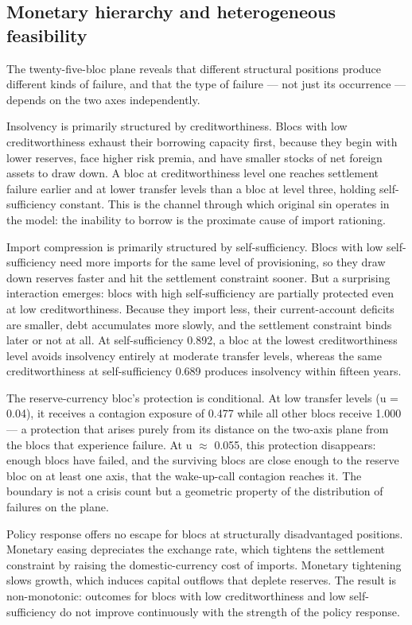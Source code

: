 \documentclass[preprint,review,12pt]{elsarticle}
\begin{document}
\subsection{Monetary hierarchy and heterogeneous feasibility}

The twenty-five-bloc plane reveals that different structural positions
produce different kinds of failure, and that the type of failure --- not
just its occurrence --- depends on the two axes independently.

Insolvency is primarily structured by creditworthiness. Blocs with low
creditworthiness exhaust their borrowing capacity first, because they
begin with lower reserves, face higher risk premia, and have smaller
stocks of net foreign assets to draw down. A bloc at creditworthiness
level one reaches settlement failure earlier and at lower transfer
levels than a bloc at level three, holding self-sufficiency constant.
This is the channel through which original sin operates in the model:
the inability to borrow is the proximate cause of import rationing.

Import compression is primarily structured by self-sufficiency. Blocs
with low self-sufficiency need more imports for the same level of
provisioning, so they draw down reserves faster and hit the settlement
constraint sooner. But a surprising interaction emerges: blocs with high
self-sufficiency are partially protected even at low creditworthiness.
Because they import less, their current-account deficits are smaller,
debt accumulates more slowly, and the settlement constraint binds later
or not at all. At self-sufficiency 0.892, a bloc at the lowest
creditworthiness level avoids insolvency entirely at moderate transfer
levels, whereas the same creditworthiness at self-sufficiency 0.689
produces insolvency within fifteen years.

The reserve-currency bloc's protection is conditional. At low transfer
levels (u = 0.04), it receives a contagion exposure of 0.477 while all
other blocs receive 1.000 --- a protection that arises purely from its
distance on the two-axis plane from the blocs that experience failure.
At u $\approx$ 0.055, this protection disappears: enough blocs have failed, and
the surviving blocs are close enough to the reserve bloc on at least one
axis, that the wake-up-call contagion reaches it. The boundary is not a
crisis count but a geometric property of the distribution of failures on
the plane.

Policy response offers no escape for blocs at structurally disadvantaged
positions. Monetary easing depreciates the exchange rate, which tightens
the settlement constraint by raising the domestic-currency cost of
imports. Monetary tightening slows growth, which induces capital
outflows that deplete reserves. The result is non-monotonic: outcomes
for blocs with low creditworthiness and low self-sufficiency do not
improve continuously with the strength of the policy response.
\end{document}

